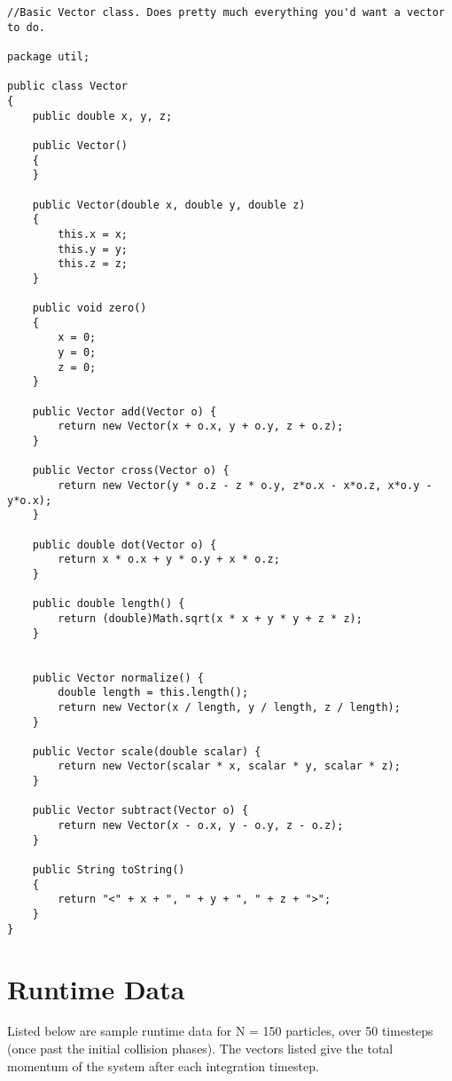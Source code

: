 \documentclass[10pt]{article}
\begin{document}
\begin{verbatim}
//Basic Vector class. Does pretty much everything you'd want a vector to do.

package util;

public class Vector 
{
	public double x, y, z;
	
	public Vector() 
	{
	}
	
	public Vector(double x, double y, double z) 
	{
		this.x = x;
		this.y = y;
		this.z = z;
	}
	
	public void zero()
	{
		x = 0;
		y = 0;
		z = 0;
	}
	
	public Vector add(Vector o) {
		return new Vector(x + o.x, y + o.y, z + o.z);
	}
	
	public Vector cross(Vector o) {
		return new Vector(y * o.z - z * o.y, z*o.x - x*o.z, x*o.y - y*o.x);
	}
	
	public double dot(Vector o) {
		return x * o.x + y * o.y + x * o.z;
	}
	
	public double length() {
		return (double)Math.sqrt(x * x + y * y + z * z);
	}
	
	
	public Vector normalize() {
		double length = this.length();
		return new Vector(x / length, y / length, z / length);
	}
	
	public Vector scale(double scalar) {
		return new Vector(scalar * x, scalar * y, scalar * z);
	}
	
	public Vector subtract(Vector o) {
		return new Vector(x - o.x, y - o.y, z - o.z);
	}
	
	public String toString()
	{
		return "<" + x + ", " + y + ", " + z + ">";
	}
}

\end{verbatim}

\section{Runtime Data}
Listed below are sample runtime data for N = 150 particles, over 50 timesteps (once past the initial collision phases). 
The vectors listed give the total momentum of the system after each integration timestep.
\end{document}
